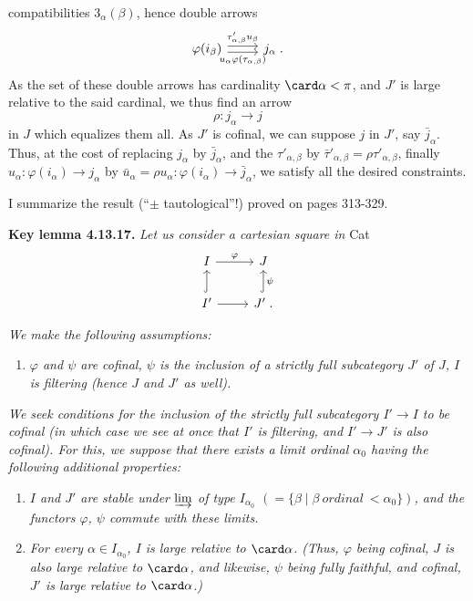 
compatibilities $3_\alpha(\beta)$, hence double arrows
\[
\begin{tikzcd}
\varphi(i_\beta) \arrow[r, shift left, "\tau'_{\alpha,\beta}u_\beta"] \arrow[r, shift right, "u_\alpha\varphi(\tau_{\alpha,\beta})"'] & j_\alpha \; .
\end{tikzcd}
\]
As the set of these double arrows has cardinality $\card\alpha < \pi$, and $J'$ is large relative to the said cardinal, we
thus find an arrow
\[
\rho : j_\alpha \longrightarrow j
\]
in $J$ which equalizes them all. As $J'$ is cofinal, we can suppose $j$ in $J'$, say $\bar{j}_\alpha$. Thus, at the cost of replacing $j_\alpha$ by $\bar{j}_\alpha$, and the $\tau'_{\alpha,\beta}$ by $\bar{\tau}'_{\alpha,\beta} = \rho\tau'_{\alpha,\beta}$, finally $u_\alpha : \varphi(i_\alpha) \longrightarrow j_\alpha$ by $\bar{u}_\alpha = \rho u_\alpha : \varphi(i_\alpha) \longrightarrow \bar{j}_\alpha$, we satisfy all the desired constraints.

I summarize the result (``$\pm$ tautological''!) proved on pages 313-329.

\textbf{Key lemma 4.13.17.} \textit{Let us consider a cartesian square in} Cat
\[
\begin{tikzcd}
I \arrow[r, "\varphi"] & J \\
I' \arrow[u, hook] \arrow[r] & J' \arrow[u, hook, "\psi"'] \; .
\end{tikzcd}
\]

\textit{We make the following assumptions:}


\begin{enumerate}[label={}]
\item[\textit{1)}] \textit{$\varphi$ and $\psi$ are cofinal, $\psi$ is the inclusion of a strictly full subcategory $J'$ of $J$, $I$ is filtering (hence $J$ and $J'$ as well).}
\end{enumerate}

\textit{We seek conditions for the inclusion of the strictly full subcategory $I' \longrightarrow I$ to be cofinal (in which case we see at once that $I'$ is filtering, and $I' \longrightarrow J'$ is also cofinal). For this, we suppose that there exists a \textup{limit ordinal} $\alpha_0$ having the following additional properties:}

\begin{enumerate}[label={}]
\item[\textit{2)}] \textit{$I$ and $J'$ are stable under $\varinjlim$ of type $I_{\alpha_0}$ $(= \{\beta \mid \beta \ \textit{ordinal}\ < \alpha_0\})$, and the functors $\varphi$, $\psi$ commute with these limits.}
\item[\textit{3)}] \textit{For every $\alpha \in I_{\alpha_0}$, $I$ is large relative to $\card\alpha$. (Thus, $\varphi$ being cofinal, $J$ is also large relative to $\card\alpha$, and likewise, $\psi$ being fully faithful, and cofinal, $J'$ is large relative to $\card\alpha$.)}
\end{enumerate}

